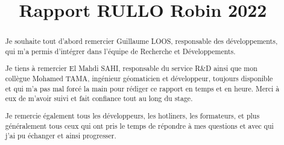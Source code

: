 \documentclass{rapportUHA40}
\title{Rapport RULLO Robin 2022} %
\begin{document}









\fairepagedegarde%
\fairemarges%



\begin{center}
  \begin{abstract}
    Je souhaite tout d’abord remercier Guillaume LOOS, responsable des
    développements, qui m'a permis d'intégrer dans l'équipe de Recherche et Développements.
    \vspace{1cm}

    Je tiens à remercier El Mahdi SAHI, responsable du service R\&D ainsi que mon
    collègue Mohamed TAMA, ingénieur géomaticien et développeur, toujours
    disponible et qui m'a pas mal forcé la main pour rédiger ce rapport en temps et
    en heure. Merci à eux de m’avoir suivi et fait confiance tout au long du stage.
    \vspace{1cm}

    Je remercie également tous les développeurs, les hotliners, les formateurs, et
    plus généralement tous ceux qui ont pris le temps de répondre à mes questions
    et avec qui j'ai pu échanger et ainsi progresser.
  \end{abstract}
\end{center}
\newpage
\end{document}
